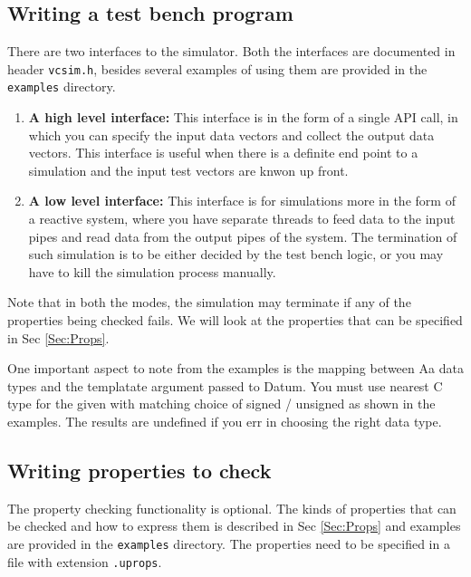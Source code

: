 \documentclass[12pt,a4paper]{article}
\begin{document}
\subsection{Writing a test bench program}

There are two interfaces to the simulator. Both the interfaces are documented in header \texttt{vcsim.h}, besides several examples of using them are provided in the \texttt{examples} directory.

\begin{enumerate}
\item \textbf{A high level interface:} This interface is in the form of a single API call, in which you can specify the input data vectors and collect the output data vectors. This interface is useful when there is a definite end point to a simulation and the input test vectors are knwon up front.
\item \textbf{A low level interface:} This interface is for simulations more in the form of a reactive system, where you have separate threads to feed data to the input pipes and read data from the output pipes of the system. The termination of such simulation is to be either decided by the test bench logic, or you may have to kill the simulation process manually.
\end{enumerate}

Note that in both the modes, the simulation may terminate if any of the properties being checked fails. We will look at the properties that can be specified in Sec \ref{Sec:Props}.

One important aspect to note from the examples is the mapping between Aa data types and the templatate argument passed to Datum. You must use nearest C type for the given with matching choice of signed / unsigned as shown in the examples. The results are undefined if you err in choosing the right data type.

\subsection{Writing properties to check}

The property checking functionality is optional. The kinds of properties that can be checked and how to express them is described in Sec \ref{Sec:Props} and examples are provided in the \texttt{examples} directory. The properties need to be specified in a file with extension \texttt{.uprops}.

\end{document}
